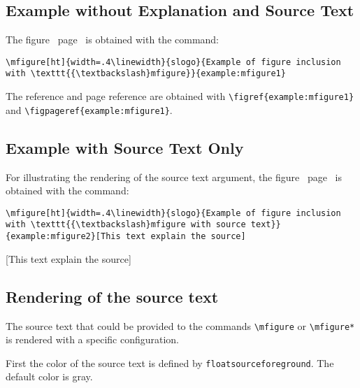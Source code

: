 \documentclass[book,taskpackage,specpackage,codepackage]{upmethodology-document}
\begin{document}
\subsection{Example without Explanation and Source Text}

The figure~ page~ is obtained with the command:

\texttt{{\textbackslash}mfigure[ht]\{width=.4{\textbackslash}linewidth\}\{slogo\}\{Example of figure inclusion with {\textbackslash}texttt\{\{{\textbackslash}textbackslash\}mfigure\}\}\{example:mfigure1\}}

The reference and page reference are obtained with \texttt{{\textbackslash}figref\{example:mfigure1\}} and \texttt{{\textbackslash}figpageref\{example:mfigure1\}}.


\subsection{Example with Source Text Only}

For illustrating the rendering of the source text argument, the figure~ page~ is obtained with the command:

\texttt{{\textbackslash}mfigure[ht]\{width=.4{\textbackslash}linewidth\}\{slogo\}\{Example of figure inclusion with {\textbackslash}texttt\{\{{\textbackslash}textbackslash\}mfigure with source text\}\}\{example:mfigure2\}[This text explain the source]}

[This text explain the source]

\subsection{Rendering of the source text}

The source text that could be provided to the commands \texttt{{\textbackslash}mfigure} or \texttt{{\textbackslash}mfigure*} is rendered with a specific configuration.

First the color of the source text is defined by \texttt{floatsourceforeground}. The default color is \textcolor{floatsourceforeground}{gray}.
\end{document}

